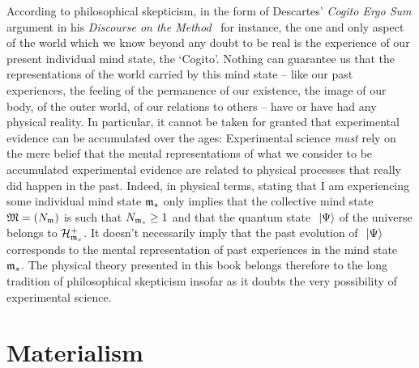 According to philosophical skepticism, in the form of Descartes' \textit{Cogito Ergo Sum} argument in his \textit{Discourse on the Method}~\cite{Descartes1637} for instance, the one and only aspect of the world which we know beyond any doubt to be real is the experience of our present individual mind state, the `Cogito'. Nothing can guarantee us that the representations of the world carried by this mind state -- like our past experiences, the feeling of the permanence of our existence, the image of our body, of the outer world, of our relations to others -- have or have had any physical reality. In particular, it cannot be taken for granted that experimental evidence can be accumulated over the ages: Experimental science \textit{must} rely on the mere belief that the mental representations of what we consider to be accumulated experimental evidence are related to physical processes that really did happen in the past. Indeed, in physical terms, stating that I am experiencing some individual mind state $\mathfrak{m}_s$ only implies that the collective mind state $\mathfrak{M} = ({N}_{\mathfrak{m}})$ is such that ${N}_{\mathfrak{m}_s} \geq 1$ and that the quantum state $\ \left|{\Psi}\right\rangle$ of the universe belongs to $\mathcal H_{\mathfrak{m}_s}^+$. It doesn't necessarily imply that the past evolution of $\ \left|{\Psi}\right\rangle$ corresponds to the mental representation of past experiences in the mind state $\mathfrak{m}_s$. The physical theory presented in this book belongs therefore to the long tradition of philosophical skepticism insofar as it doubts the very possibility of experimental science.




\section{Materialism}

